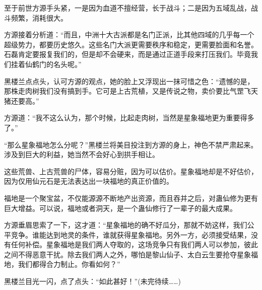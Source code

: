 \begin{this_body}
至于前世方源手头紧，一是因为血道不擅经营，长于战斗；二是因为五域乱战，战斗频繁，消耗很大。

方源接着分析道：“而且，中洲十大古派都是名门正派，比其他四域的几乎每一个超级势力，都要历史悠久。这些名门大派更需要秩序和稳定，更需要脸面和名誉。石磊肯定要报复我们的，但是却不会硬来，而是通过正道手段来打压我们。毕竟我们挂着仙鹤门的名头呢。”

黑楼兰点点头，认可方源的观点，她的脸上又浮现出一抹可惜之色：“遗憾的是，那株走肉树我们没有搞到手。它可是上古荒植，又是传说之物，卖价要比气罡飞天猪还要高。”

方源道：“我不这么认为，那个时候，比起走肉树，当然是星象福地更为重要得多了。”

“那么星象福地怎么分呢？”黑楼兰将美目投注到方源的身上，神色不禁严肃起来。涉及到巨大的利益，她当然不会好心到拱手相让。

这些荒兽、上古荒兽的尸体，容易分赃，因为可以估价。星象福地却是不好估价，因为仅用仙元石是无法表达出一块福地的真正价值的。

福地是一个聚宝盆，不仅能源源不断地产出资源，而且吞并之后，对蛊仙修为更有巨大增益。可以说，福地或者洞天，是一个蛊仙修行了一辈子的最大成果。

方源垂眉思索了一下，这才道：“星象福地的确不好瓜分，那就不妨这样，我们公平竞争。谁能达到地灵的条件，谁就获得星象福地。另外一方，必须接受结果，没有任何补偿。星象福地是我们两人夺取的，这场竞争只有我们两人可以参加，彼此之间不得恶意干扰。除去我们两人之外，哪怕是黎山仙子、太白云生要抢夺星象福地，我们都得合力制止。你看如何？”

黑楼兰目光一闪，点了点头：“如此甚好！”(未完待续……)

\end{this_body}

